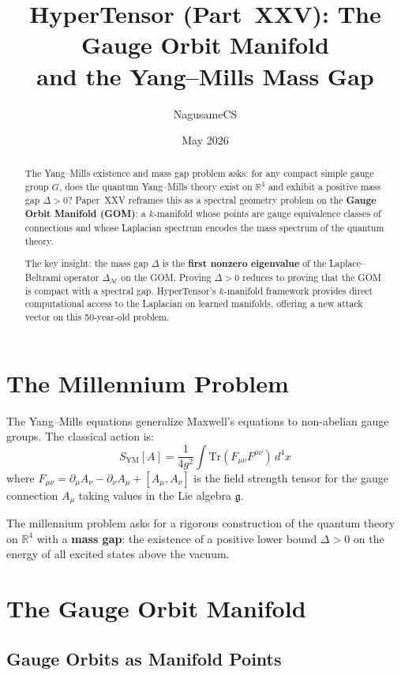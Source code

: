 \documentclass{article}
\title{HyperTensor (Part~XXV): The Gauge Orbit Manifold\\
and the Yang--Mills Mass Gap}
\author{NagusameCS}
\date{May 2026}
\begin{document}
\maketitle

\begin{abstract}
The Yang--Mills existence and mass gap problem asks: for any compact simple
gauge group $G$, does the quantum Yang--Mills theory exist on $\mathbb{R}^4$
and exhibit a positive mass gap $\Delta > 0$?  Paper~XXV reframes this as a
spectral geometry problem on the \textbf{Gauge Orbit Manifold (GOM)}: a
$k$-manifold whose points are gauge equivalence classes of connections and
whose Laplacian spectrum encodes the mass spectrum of the quantum theory.

The key insight: the mass gap $\Delta$ is the \textbf{first nonzero eigenvalue}
of the Laplace--Beltrami operator $\Delta_{\mathcal{M}}$ on the GOM.  Proving
$\Delta > 0$ reduces to proving that the GOM is compact with a spectral gap.
HyperTensor's $k$-manifold framework provides direct computational access to
the Laplacian on learned manifolds, offering a new attack vector on this
50-year-old problem.
\end{abstract}

\section{The Millennium Problem}
\label{sec:ym-problem}

The Yang--Mills equations generalize Maxwell's equations to non-abelian gauge
groups.  The classical action is:
\begin{equation}
S_{\mathrm{YM}}[A] = \frac{1}{4g^2} \int \mathrm{Tr}(F_{\mu\nu}F^{\mu\nu}) \, d^4x
\end{equation}
where $F_{\mu\nu} = \partial_\mu A_\nu - \partial_\nu A_\mu + [A_\mu, A_\nu]$
is the field strength tensor for the gauge connection $A_\mu$ taking values
in the Lie algebra $\mathfrak{g}$.

The millennium problem asks for a rigorous construction of the quantum theory
on $\mathbb{R}^4$ with a \textbf{mass gap}: the existence of a positive lower
bound $\Delta > 0$ on the energy of all excited states above the vacuum.

\section{The Gauge Orbit Manifold}
\label{sec:gom}

\subsection{Gauge Orbits as Manifold Points}
\end{document}
